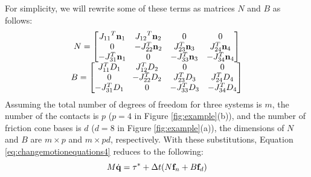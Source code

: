 For simplicity, we will rewrite some of these terms as matrices $N$ and $B$ as follows:
\begin{equation}
\label{eq:nbmatrix}
\begin{array}{cc}
N = \left[\begin{matrix}{J_{11}}^T\mathbf{n}_1 &
    {J_{12}}^T\mathbf{n}_2 & 0 & 0 \\ 0 & -J_{22}^T\mathbf{n}_2 & J_{23}^T
    \mathbf{n}_3 & J_{24}^T \mathbf{n}_4 \\ -J_{31}^T \mathbf{n}_1 & 0 & -J_{33}^T
    \mathbf{n}_3 & -J_{34}^T
    \mathbf{n}_4  \end{matrix}\right] \\
B = \left[\begin{matrix}J_{11}^T D_1 &
    J_{12}^TD_2 & 0 & 0 \\ 0 & -J_{22}^TD_2 & J_{23}^T
    D_3 & J_{24}^T D_4 \\ -J_{31}^T D_1 & 0 & -J_{33}^T
    D_3 & -J_{34}^T
    D_4 \end{matrix}\right]
\end{array}
\end{equation}
Assuming the total number of degrees of freedom for three systems is
$m$, the number of the contacts is $p$ ($p=4$ in Figure
\ref{fig:example}(b)), and the number of friction cone bases is $d$
($d = 8$ in Figure \ref{fig:example}(a)), the dimensions of $N$ and
$B$ are $m \times p$ and $m \times pd$, respectively. With these
substitutions, Equation \ref{eq:changemotionequations4} reduces to the
following:
\begin{equation}
\label{eq:changemotionequations5}
M\dot{\mathbf{q}} = \tau^* + \Delta{t} (N\mathbf{f}_n + B\mathbf{f}_d)
\end{equation}


